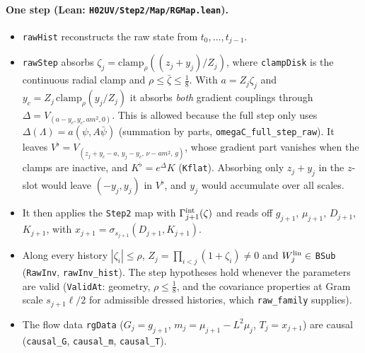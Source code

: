 \documentclass[11pt]{amsart}
\theoremstyle{definition}
\theoremstyle{remark}
\numberwithin{equation}{section}
\begin{document}
\paragraph{One step (Lean: \texttt{H02UV/Step2/Map/RGMap.lean}).}
\begin{itemize}
\item \texttt{rawHist} reconstructs the raw state from $t_0,\dots,t_{j-1}$.
\item \texttt{rawStep} absorbs $\zeta_j=\mathrm{clamp}_\rho((z_j+y_j)/Z_j)$, where \texttt{clampDisk} is
  the continuous radial clamp and $\rho\le\bar\zeta\le\frac18$. With $a=Z_j\zeta_j$ and
  $y_c=Z_j\,\mathrm{clamp}_\rho(y_j/Z_j)$ it absorbs \emph{both} gradient couplings through
  $\Delta=V_{(a-y_c,y_c,am^2,0)}$. This is allowed because the full step only uses
  $\Delta(\Lambda)=a(\psi,A\bar\psi)$ (summation by parts, \texttt{omegaC\_full\_step\_raw}). It leaves
  $V^\flat=V_{(z_j+y_c-a,\,y_j-y_c,\,\nu-am^2,\,g)}$, whose gradient part vanishes when the clamps are
  inactive, and $K^\flat=e^{\Delta}K$ (\texttt{Kflat}). Absorbing only $z_j+y_j$ in the $z$-slot would
  leave $(-y_j,y_j)$ in $V^\flat$, and $y_j$ would accumulate over all scales.
\item It then applies the \texttt{Step2} map with $\Gamma^{\rm int}_{j+1}(\zeta)$ and reads off
  $g_{j+1}$, $\mu_{j+1}$, $D_{j+1}$, $K_{j+1}$, with $x_{j+1}=\sigma_{s_{j+1}}(D_{j+1},K_{j+1})$.
\item Along every history $|\zeta_i|\le\rho$, $Z_j=\prod_{i<j}(1+\zeta_i)\ne0$ and
  $W^{\rm lin}_j\in$ \texttt{BSub} (\texttt{RawInv}, \texttt{rawInv\_hist}). The step hypotheses hold
  whenever the parameters are valid (\texttt{ValidAt}: geometry, $\rho\le\frac18$, and the
  covariance properties at Gram scale $s_{j+1}\ell/2$ for admissible dressed histories, which
  \texttt{raw\_family} supplies).
\item The flow data \texttt{rgData} ($G_j=g_{j+1}$, $m_j=\mu_{j+1}-L^2\mu_j$, $T_j=x_{j+1}$) are
  causal (\texttt{causal\_G}, \texttt{causal\_m}, \texttt{causal\_T}).
\end{itemize}
\end{document}
